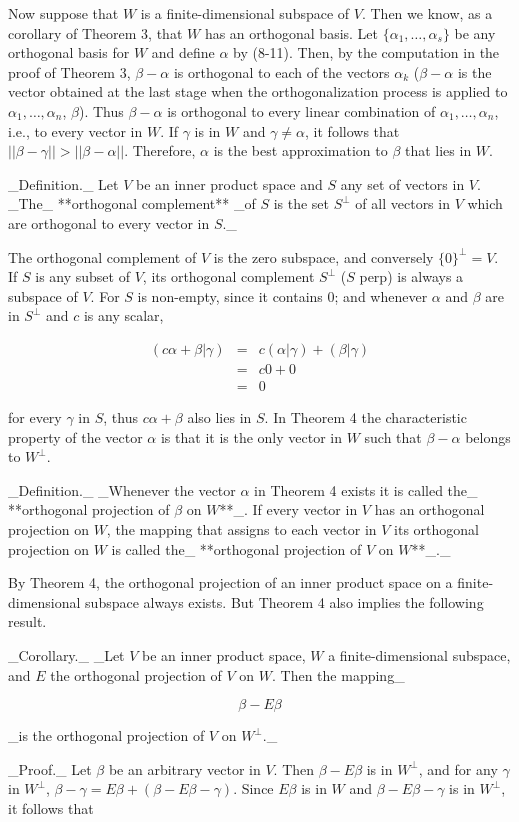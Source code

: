 Now suppose that \(W\) is a finite-dimensional subspace of \(V\). Then we know, as a corollary of Theorem 3, that \(W\) has an orthogonal basis. Let \(\{\alpha_{1},\ldots,\alpha_{s}\}\) be any orthogonal basis for \(W\) and define \(\alpha\) by (8-11). Then, by the computation in the proof of Theorem 3, \(\beta-\alpha\) is orthogonal to each of the vectors \(\alpha_{k}\) (\(\beta-\alpha\) is the vector obtained at the last stage when the orthogonalization process is applied to \(\alpha_{1},\ldots,\alpha_{n}\), \(\beta\)). Thus \(\beta-\alpha\) is orthogonal to every linear combination of \(\alpha_{1},\ldots,\alpha_{n}\), i.e., to every vector in \(W\). If \(\gamma\) is in \(W\) and \(\gamma\neq\alpha\), it follows that \(||\beta-\gamma||>||\beta-\alpha||\). Therefore, \(\alpha\) is the best approximation to \(\beta\) that lies in \(W\).

_Definition._ Let \(V\) be an inner product space and \(S\) any set of vectors in \(V\). _The_ **orthogonal complement** _of \(S\) is the set \(S^{\perp}\) of all vectors in \(V\) which are orthogonal to every vector in \(S\)._

The orthogonal complement of \(V\) is the zero subspace, and conversely \(\{0\}^{\perp}=V\). If \(S\) is any subset of \(V\), its orthogonal complement \(S^{\perp}\) (\(S\) perp) is always a subspace of \(V\). For \(S\) is non-empty, since it contains \(0\); and whenever \(\alpha\) and \(\beta\) are in \(S^{\perp}\) and \(c\) is any scalar,

\[\begin{array}{rl}(c\alpha+\beta|\gamma)&=&c(\alpha|\gamma)+(\beta|\gamma)\\ &=&c0+0\\ &=&0\end{array}\]

for every \(\gamma\) in \(S\), thus \(c\alpha+\beta\) also lies in \(S\). In Theorem 4 the characteristic property of the vector \(\alpha\) is that it is the only vector in \(W\) such that \(\beta-\alpha\) belongs to \(W^{\perp}\).

_Definition._ _Whenever the vector \(\alpha\) in Theorem 4 exists it is called the_ **orthogonal projection of \(\beta\) on \(W\)**_. If every vector in \(V\) has an orthogonal projection on \(W\), the mapping that assigns to each vector in \(V\) its orthogonal projection on \(W\) is called the_ **orthogonal projection of \(V\) on \(W\)**_._

By Theorem 4, the orthogonal projection of an inner product space on a finite-dimensional subspace always exists. But Theorem 4 also implies the following result.

_Corollary._ _Let \(V\) be an inner product space, \(W\) a finite-dimensional subspace, and \(E\) the orthogonal projection of \(V\) on \(W\). Then the mapping_

\[\beta-E\beta\]

_is the orthogonal projection of \(V\) on \(W^{\perp}\)._

_Proof._ Let \(\beta\) be an arbitrary vector in \(V\). Then \(\beta-E\beta\) is in \(W^{\perp}\), and for any \(\gamma\) in \(W^{\perp}\), \(\beta-\gamma=E\beta+(\beta-E\beta-\gamma)\). Since \(E\beta\) is in \(W\) and \(\beta-E\beta-\gamma\) is in \(W^{\perp}\), it follows that 